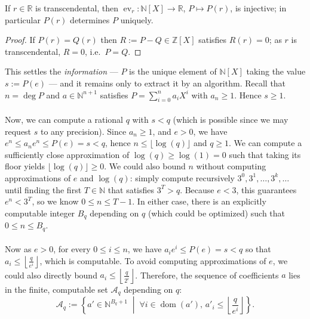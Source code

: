 \begin{solution}
    \begin{lemma}\label{lem:transc}
        If \( r\in\mathbb{R} \) is transcendental, then \( \operatorname{ev}_r\colon\mathbb{N}\left[X\right]\to\mathbb{R} \), \( P\mapsto P\left(r\right) \), is injective; in particular \( P\left(r\right) \) determines \( P \) uniquely.
    \end{lemma}
    \begin{proof}
        If \( P\left(r\right)=Q\left(r\right) \) then \( R:=P-Q\in\mathbb{Z}\left[X\right] \) satisfies \( R\left(r\right)=0 \); as \( r \) is transcendental, \( R=0 \), i.e.\ \( P=Q \).
    \end{proof}
    This settles the \emph{information} --- \( P \) is the unique element of \( \mathbb{N}\left[X\right] \) taking the value \( s:=P\left(e\right) \) --- and it remains only to extract it by an algorithm. Recall that \( n=\deg P \) and \( a\in\mathbb{N}^{n+1} \) satisfies \( P=\sum_{i=0}^{n}a_iX^i \) with \( a_n\ge 1 \). Hence \( s\geq 1 \).
    \\\\
    Now, we can compute a rational \( q \) with \( s<q \) (which is possible since we may request \( s \) to any precision). Since \( a_n\ge 1 \), and \( e>0 \), we have \( e^{n}\le a_n e^{n}\le P\left(e\right)=s<q \), hence \( n\leq\lfloor\log\left(q\right)\rfloor \) and \( q\geq 1 \). We can compute a sufficiently close approximation of \( \log\left(q\right) \geq \log\left(1\right) = 0 \) such that taking its floor yields \( \lfloor\log\left(q\right)\rfloor\geq 0 \). We could also bound \( n \) without computing approximations of \( e \) and \( \log\left(q\right) \): simply compute recursively \( 3^0, 3^1, \dots, 3^k, \dots \) until finding the first \( T\in\mathbb{N} \) that satisfies \( 3^T > q \). Because \( e < 3 \), this guarantees \( e^n < 3^T \), so we know \( 0\leq n \leq T-1 \). In either case, there is an explicitly computable integer \( B_q \) depending on \( q \) (which could be optimized) such that \( 0\leq n \leq B_q \).
    \\\\
    Now as \( e>0 \), for every \( 0\leq i\leq n \), we have \( a_ie^{i}\le P\left(e\right)=s<q \) so that \( a_i\leq\left\lfloor\frac{q}{e^i}\right\rfloor \), which is computable. To avoid computing approximations of \( e \), we could also directly bound \( a_i\leq \left\lfloor \frac{q}{2^i} \right\rfloor \). Therefore, the sequence of coefficients \( a \) lies in the finite, computable set \( \mathcal{A}_q \) depending on \( q \):
    \[
        \mathcal{A}_{q}:=\left\{a'\in \mathbb{N}^{B_q + 1} \;\middle|\; \forall i \in \operatorname{dom}\left(a'\right),\, a'_i\leq\left\lfloor\frac{q}{e^i}\right\rfloor\right\}.
    \]


\end{solution}
